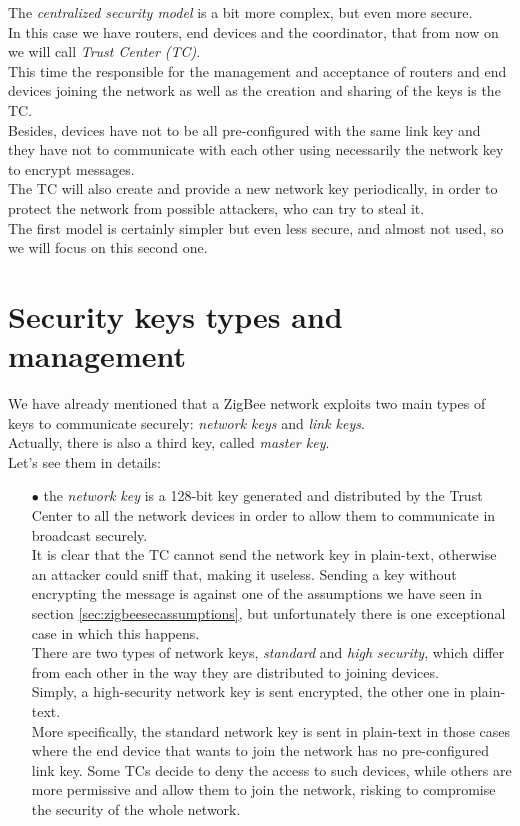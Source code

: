 \documentclass[12pt]{report}
\begin{document}
{{The \emph{centralized security model} is a bit more complex, but even more secure.\\
In this case we have routers, end devices and the coordinator, that from now on we will call \emph{Trust Center (TC)}.\\
This time the responsible for the management and acceptance of routers and end devices joining the network as well as the creation and sharing of the keys is the TC.\\
Besides, devices have not to be all pre-configured with the same link key and they have not to communicate with each other using necessarily the network key to encrypt messages.\\
The TC will also create and provide a new network key periodically, in order to protect the network from possible attackers, who can try to steal it.\\

The first model is certainly simpler but even less secure, and almost not used, so we will focus on this second one}.\\

\section{Security keys types and management}
\label{sec:zigbeeseckeys}
\bigskip
We have already mentioned that a ZigBee network exploits two main types of keys to communicate securely: \emph{network keys} and \emph{link keys}.\\
Actually, there is also a third key, called \emph{master key}.\\
Let's see them in details:

\begin{itemize}
\setlength{\itemindent}{+4mm}
\item[$\bullet$] the \emph{network key} is a 128-bit key generated and distributed by the Trust Center to all the network devices in order to allow them to communicate in broadcast securely.\\
It is clear that the TC cannot send the network key in plain-text, otherwise an attacker could sniff that, making it useless. Sending a key without encrypting the message is against one of the assumptions we have seen in section \ref{sec:zigbeesecassumptions}, but unfortunately there is one exceptional case in which this happens.\\

There are two types of network keys, \emph{standard} and \emph{high security}, which differ from each other in the way they are distributed to joining devices. \\
Simply, a high-security network key is sent encrypted, the other one in plain-text.\\
More specifically, the standard network key is sent in plain-text in those cases where the end device that wants to join the network has no pre-configured link key. Some TCs decide to deny the access to such devices, while others are more permissive and allow them to join the network, risking to compromise the security of the whole network.\\


\end{itemize}}
\end{document}
